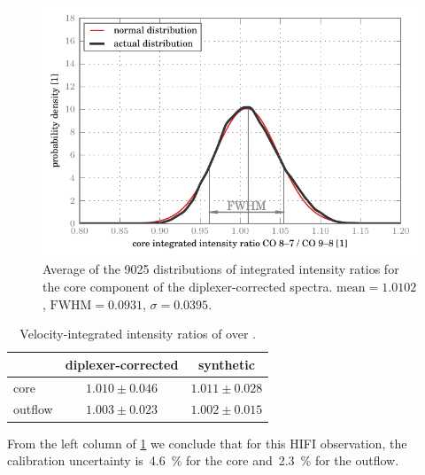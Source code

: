 \begin{figure}[b]
    \centering
    \includegraphics[width=\textwidth]{ratios_core_corrected}
    \caption{
        Average of the 9025 distributions of integrated intensity ratios
        for the core component of the diplexer-corrected spectra.
        $\text{mean}=1.0102$, $\text{FWHM}=0.0931$, $\sigma=0.0395$.
    }
    \label{fig:ratio_core}
\end{figure}
\begin{table}[b]
    \centering
    \begin{tabular}{lcc}
        \toprule
                & diplexer-corrected   & synthetic \\
        \midrule
        core    & $1.010 \pm 0.046$ & $1.011 \pm 0.028$ \\
        outflow & $1.003 \pm 0.023$ & $1.002 \pm 0.015$ \\
        \bottomrule
    \end{tabular}
    \caption{
        Velocity-integrated intensity ratios of
         over .
    }
    \label{tab:line_ratios}
\end{table}


From the left column of \cref{tab:line_ratios} we conclude that for this HIFI observation, the calibration uncertainty
is~\SI{4.6}{\percent} for the core
and~\SI{2.3}{\percent} for the outflow.

